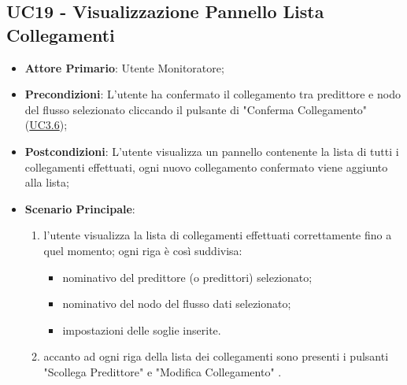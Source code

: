 	

	\label{par:UC19}
	\subsection{UC19 - Visualizzazione Pannello Lista Collegamenti}
		\begin{itemize}
			\item\textbf{Attore Primario}: Utente Monitoratore;
			\item\textbf{Precondizioni}: L’utente ha confermato il collegamento tra predittore e nodo del flusso selezionato cliccando il pulsante di "Conferma Collegamento" (\hyperref[par:UC3.6]{UC3.6});
			\item\textbf{Postcondizioni}: L’utente visualizza un pannello contenente la lista di tutti i collegamenti effettuati, ogni nuovo collegamento confermato viene aggiunto alla lista; 
			\item\textbf{Scenario Principale}: 
				\begin{enumerate} 
					\item l'utente visualizza la lista di collegamenti effettuati correttamente fino a quel momento; ogni riga è così suddivisa:
					\begin{itemize}
						\item nominativo del predittore (o predittori) selezionato;
						\item nominativo del nodo del flusso dati selezionato;
						\item impostazioni delle soglie inserite.
					\end{itemize}
					\item accanto ad ogni riga della lista dei collegamenti sono presenti i pulsanti "Scollega Predittore" e "Modifica Collegamento" .	
				\end{enumerate}		
		\end{itemize}


	\label{par:UC20}
